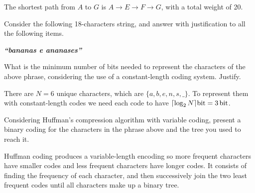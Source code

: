 \documentclass{cal}
\begin{document}
{The shortest path from $A$ to $G$ is $A \rightarrow E \rightarrow F \rightarrow G$, with a total weight of 20.

Consider the following 18-characters string, and answer with justification to all the following items.
\begin{center}
    \textbf{\textit{``bananas e ananases''}}
\end{center}

What is the minimum number of bits needed to represent the characters of the above phrase, considering the use of a constant-length coding system. Justify.

\ansseparator

There are $N=6$ unique characters, which are $\{a, b, e, n, s, \_\}$. To represent them with constant-length codes we need each code to have $\lceil \log_2{N} \rceil \SI{}{\bit} = \SI{3}{\bit}$.

Considering Huffman's compression algorithm with variable coding, present a binary coding for the characters in the phrase above and the tree you used to reach it.

\ansseparator

Huffman coding produces a variable-length encoding so more frequent characters have smaller codes and less frequent characters have longer codes. It consists of finding the frequency of each character, and then successively join the two least frequent codes until all characters make up a binary tree.

\newpage

}
\end{document}
